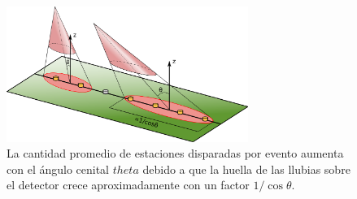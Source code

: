	\begin{figure}[h!]
		\begin{center}
			\includegraphics[width=0.7\textwidth]{fig/resultadosAuger/huellas}
			\caption{La cantidad promedio de estaciones disparadas por evento aumenta con el ángulo cenital $theta$ debido a que la huella de las llubias sobre el detector crece aproximadamente con un factor $1/\cos\theta$.}
			\label{fig:effDG_th_sktch}
		\end{center}
	\end{figure}
	

